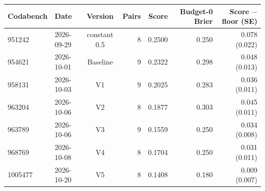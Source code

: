 \begin{tabular}{llcrrrr}
\toprule
Codabench & Date & Version & Pairs & Score & Budget-0 Brier & Score $-$ floor (SE) \\
\midrule
951242 & 2026-09-29 & constant 0.5 & 8 & 0.2500 & 0.250 & 0.078 (0.022) \\
954621 & 2026-10-01 & Baseline & 9 & 0.2322 & 0.298 & 0.048 (0.013) \\
958131 & 2026-10-03 & V1 & 9 & 0.2025 & 0.283 & 0.036 (0.011) \\
963204 & 2026-10-06 & V2 & 8 & 0.1877 & 0.303 & 0.045 (0.011) \\
963789 & 2026-10-06 & V3 & 9 & 0.1559 & 0.250 & 0.034 (0.008) \\
968769 & 2026-10-08 & V4 & 8 & 0.1704 & 0.250 & 0.031 (0.011) \\
1005477 & 2026-10-20 & V5 & 8 & 0.1408 & 0.180 & 0.009 (0.007) \\
\bottomrule
\end{tabular}
